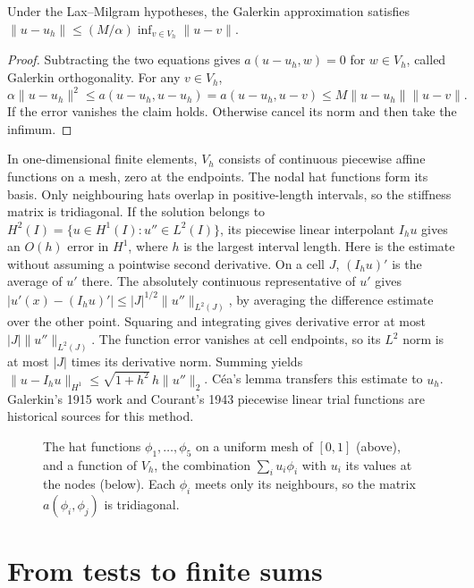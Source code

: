 \begin{proposition}[C\'ea's lemma]\label{prop:cea}
Under the Lax--Milgram hypotheses, the Galerkin approximation satisfies
$\|u-u_h\|\le(M/\alpha)\inf_{v\in V_h}\|u-v\|$.
\end{proposition}
\begin{proof}
Subtracting the two equations gives $a(u-u_h,w)=0$ for $w\in V_h$, called Galerkin orthogonality. For any $v\in V_h$,
\[
\alpha\|u-u_h\|^2\le a(u-u_h,u-u_h)
=a(u-u_h,u-v)\le M\|u-u_h\|\|u-v\|.
\]
If the error vanishes the claim holds. Otherwise cancel its norm and then take the infimum.
\end{proof}

In one-dimensional finite elements, $V_h$ consists of continuous piecewise affine functions on a mesh, zero at the endpoints. The nodal hat functions form its basis. Only neighbouring hats overlap in positive-length intervals, so the stiffness matrix is tridiagonal.
If the solution belongs to $H^2(I)=\{u\in H^1(I):u''\in L^2(I)\}$, its piecewise linear interpolant $I_hu$ gives an $O(h)$ error in $H^1$, where $h$ is the largest interval length. Here is the estimate without assuming a pointwise second derivative. On a cell $J$, $(I_hu)'$ is the average of $u'$ there. The absolutely continuous representative of $u'$ gives
$|u'(x)-(I_hu)'|\le |J|^{1/2}\|u''\|_{L^2(J)}$,
by averaging the difference estimate over the other point. Squaring and integrating gives derivative error at most $|J|\|u''\|_{L^2(J)}$. The function error vanishes at cell endpoints, so its $L^2$ norm is at most $|J|$ times its derivative norm. Summing yields
$\|u-I_hu\|_{H^1}\le\sqrt{1+h^2}\,h\|u''\|_2$.
C\'ea's lemma transfers this estimate to $u_h$. Galerkin's 1915 work and Courant's 1943 piecewise linear trial functions are historical sources for this method.

\begin{figure}[ht]
\centering
{}
\caption{The hat functions $\phi_1,\dots,\phi_5$ on a uniform mesh of $[0,1]$ (above), and a function of $V_h$, the combination $\sum_iu_i\phi_i$ with $u_i$ its values at the nodes (below). Each $\phi_i$ meets only its
neighbours, so the matrix $a(\phi_i,\phi_j)$ is tridiagonal.}
\label{fig:hats}
\end{figure}

\section{From tests to finite sums}

